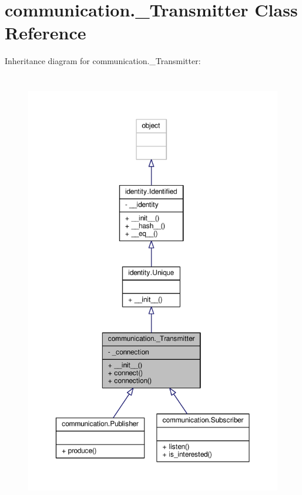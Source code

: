 \hypertarget{classcommunication_1_1__Transmitter}{}\section{communication.\+\_\+\+Transmitter Class Reference}
\label{classcommunication_1_1__Transmitter}


Inheritance diagram for communication.\+\_\+\+Transmitter\+:\nopagebreak
\begin{figure}[H]
\begin{center}
\leavevmode
\includegraphics[height=550pt]{classcommunication_1_1__Transmitter__inherit__graph}
\end{center}
\end{figure}


